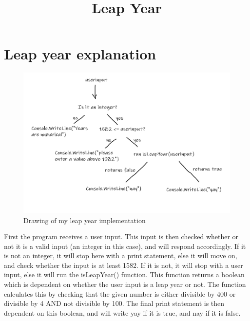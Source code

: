 \documentclass{article}
\title{Leap Year}
\begin{document}
\maketitle

\section{Leap year explanation}

\begin{figure}
    \centering
    \includegraphics[width=\textwidth]{Leap_Year.png}
    \caption{Drawing of my leap year implementation}
    \label{fig:my_label}
\end{figure}
    
First the program receives a user input. This input is then checked whether or not it is a valid input (an integer in this case), and will respond accordingly. If it is not an integer, it will stop here with a print statement, else it will move on, and check whether the input is at least 1582. If it is not, it will stop with a user input, else it will run the isLeapYear() function. This function returns a boolean which is dependent on whether the user input is a leap year or not. The function calculates this by checking that the given number is either divisible by 400 or divisible by 4 AND not divisible by 100. The final print statement is then dependent on this boolean, and will write yay if it is true, and nay if it is false.
\end{document}
